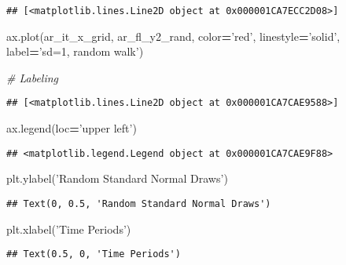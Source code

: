 \documentclass[
]{book}
\newenvironment{Shaded}{\begin{snugshade}}{\end{snugshade}}
\newcommand{\CommentTok}[1]{\textcolor[rgb]{0.56,0.35,0.01}{\textit{#1}}}
\newcommand{\NormalTok}[1]{#1}
\newcommand{\OperatorTok}[1]{\textcolor[rgb]{0.81,0.36,0.00}{\textbf{#1}}}
\newcommand{\StringTok}[1]{\textcolor[rgb]{0.31,0.60,0.02}{#1}}
\begin{document}
\begin{verbatim}
## [<matplotlib.lines.Line2D object at 0x000001CA7ECC2D08>]
\end{verbatim}

\begin{Shaded}
\begin{Highlighting}[]
\NormalTok{ax.plot(ar_it_x_grid, ar_fl_y2_rand,}
\NormalTok{                     color}\OperatorTok{=}\StringTok{'red'}\NormalTok{, linestyle}\OperatorTok{=}\StringTok{'solid'}\NormalTok{,}
\NormalTok{                     label}\OperatorTok{=}\StringTok{'sd=1, random walk'}\NormalTok{)}
                     
\CommentTok{# Labeling}
\end{Highlighting}
\end{Shaded}

\begin{verbatim}
## [<matplotlib.lines.Line2D object at 0x000001CA7CAE9588>]
\end{verbatim}

\begin{Shaded}
\begin{Highlighting}[]
\NormalTok{ax.legend(loc}\OperatorTok{=}\StringTok{'upper left'}\NormalTok{)}
\end{Highlighting}
\end{Shaded}

\begin{verbatim}
## <matplotlib.legend.Legend object at 0x000001CA7CAE9F88>
\end{verbatim}

\begin{Shaded}
\begin{Highlighting}[]
\NormalTok{plt.ylabel(}\StringTok{'Random Standard Normal Draws'}\NormalTok{)}
\end{Highlighting}
\end{Shaded}

\begin{verbatim}
## Text(0, 0.5, 'Random Standard Normal Draws')
\end{verbatim}

\begin{Shaded}
\begin{Highlighting}[]
\NormalTok{plt.xlabel(}\StringTok{'Time Periods'}\NormalTok{)}
\end{Highlighting}
\end{Shaded}

\begin{verbatim}
## Text(0.5, 0, 'Time Periods')
\end{verbatim}
\end{document}

